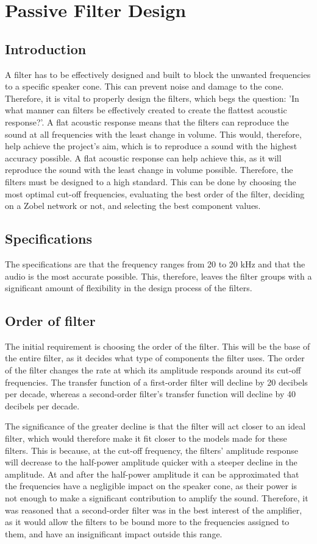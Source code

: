 \chapter{Passive Filter Design}
\label{chapter:PassiveFilterDesign}

\section{Introduction}
A filter has to be effectively designed and built to block the unwanted frequencies to a specific speaker cone. This can prevent noise and damage to the cone. Therefore, it is vital to properly design the filters, which begs the question: 'In what manner can filters be effectively created to create the flattest acoustic response?'. A flat acoustic response means that the filters can reproduce the sound at all frequencies with the least change in volume. This would, therefore, help achieve the project's aim, which is to reproduce a sound with the highest accuracy possible. A flat acoustic response can help achieve this, as it will reproduce the sound with the least change in volume possible. Therefore, the filters must be designed to a high standard. This can be done by choosing the most optimal cut-off frequencies, evaluating the best order of the filter, deciding on a Zobel network or not, and selecting the best component values. 
\section{Specifications}
The specifications are that the frequency ranges from 20 to 20 kHz and that the audio is the most accurate possible. This, therefore, leaves the filter groups with a significant amount of flexibility in the design process of the filters. 

\section{Order of filter}
The initial requirement is choosing the order of the filter. This will be the base of the entire filter, as it decides what type of components the filter uses. The order of the filter changes the rate at which its amplitude responds around its cut-off frequencies. The transfer function of a first-order filter will decline by 20 decibels per decade, whereas a second-order filter's transfer function will decline by 40 decibels per decade. 

The significance of the greater decline is that the filter will act closer to an ideal filter, which would therefore make it fit closer to the models made for these filters. This is because, at the cut-off frequency, the filters' amplitude response will decrease to the half-power amplitude quicker with a steeper decline in the amplitude. At and after the half-power amplitude it can be approximated that the frequencies have a negligible impact on the speaker cone, as their power is not enough to make a significant contribution to amplify the sound. Therefore, it was reasoned that a second-order filter was in the best interest of the amplifier, as it would allow the filters to be bound more to the frequencies assigned to them, and have an insignificant impact outside this range. 

